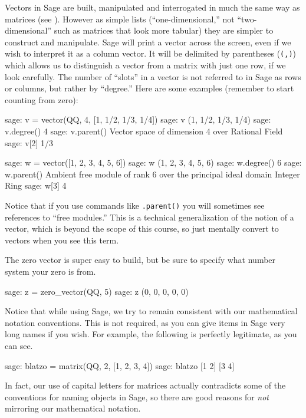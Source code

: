 Vectors in Sage are built, manipulated and interrogated in much the same way as matrices (see ).  However as simple lists (``one-dimensional,'' not ``two-dimensional'' such as matrices that look more tabular) they are simpler to construct and manipulate.  Sage will print a vector across the screen, even if we wish to interpret it as a column vector.  It will be delimited by parentheses (\verb?(,)?) which allows us to distinguish a vector from a matrix with just one row, if we look carefully.  The number of ``slots'' in a vector is not referred to in Sage as rows or columns, but rather by ``degree.''  Here are some examples (remember to start counting from zero):
%
\begin{sageexample}
sage: v = vector(QQ, 4, [1, 1/2, 1/3, 1/4])
sage: v
(1, 1/2, 1/3, 1/4)
sage: v.degree()
4
sage: v.parent()
Vector space of dimension 4 over Rational Field
sage: v[2]
1/3
\end{sageexample}
%
\begin{sageexample}
sage: w = vector([1, 2, 3, 4, 5, 6])
sage: w
(1, 2, 3, 4, 5, 6)
sage: w.degree()
6
sage: w.parent()
Ambient free module of rank 6 over
the principal ideal domain Integer Ring
sage: w[3]
4
\end{sageexample}
%
Notice that if you use commands like \verb?.parent()? you will sometimes see references to ``free modules.''  This is a technical generalization of the notion of a vector, which is beyond the scope of this course, so just mentally convert to vectors when you see this term.\par
%
The zero vector is super easy to build, but be sure to specify what number system your zero is from.
%
\begin{sageexample}
sage: z = zero_vector(QQ, 5)
sage: z
(0, 0, 0, 0, 0)
\end{sageexample}
%
Notice that while using Sage, we try to remain consistent with our mathematical notation conventions.  This is not required, as you can give items in Sage very long names if you wish.  For example, the following is perfectly legitimate, as you can see.
%
\begin{sageexample}
sage: blatzo = matrix(QQ, 2, [1, 2, 3, 4])
sage: blatzo
[1 2]
[3 4]
\end{sageexample}
%
In fact, our use of capital letters for matrices actually contradicts some of the conventions for naming objects in Sage, so there are good reasons for \emph{not} mirroring our mathematical notation.
%
\begin{sageverbatim}
\end{sageverbatim}
